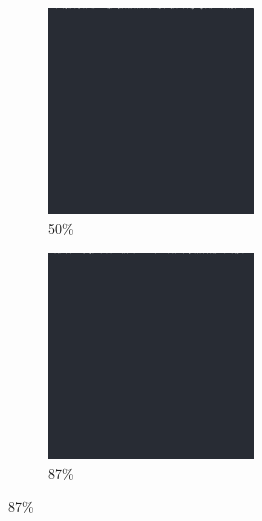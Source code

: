 \documentclass[12pt, fleqn]{report}                             %
\theoremstyle{break}                                            %
\begin{document}
\begin{figure}[ht!]
\begin{subfigure}[b]{0.4\linewidth}
          \includegraphics[width=0.6\textwidth]{Images/32/c.png}
          \caption{50\%}
        \end{subfigure}
        \begin{subfigure}[b]{0.4\linewidth}
          \includegraphics[width=0.6\textwidth]{Images/32/d.png}
          \caption{87\%}
        \end{subfigure}
      \end{figure}
\end{document}
